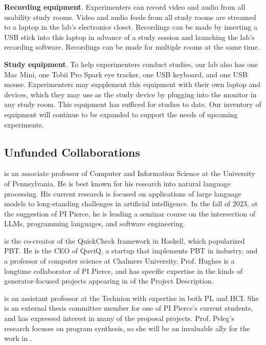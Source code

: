 \textbf{Recording equipment}. Experimenters can record video and audio from all usability study rooms. Video and audio feeds from all study rooms are streamed to a laptop in the lab's electronics closet. Recordings can be made by inserting a USB stick into this laptop in advance of a study session and launching the lab's recording software. Recordings can be made for multiple rooms at the same time.

\textbf{Study equipment}. To help experimenters conduct studies, our lab also has one Mac Mini, one Tobii Pro Spark eye tracker, one USB keyboard, and one USB mouse. Experimenters may supplement this equipment with their own laptop and devices, which they may use as the study device by plugging into the monitor in any study room. This equipment has sufficed for studies to date. Our inventory of equipment will continue to be expanded to support the needs of upcoming experiments.

\subsection*{Unfunded Collaborations}

 is an associate professor of
Computer and Information Science at the University of Pennsylvania.
%
He is best known for his research into natural language
processing. His current research is focused on applications of large
language models to long-standing challenges in artificial
intelligence. In the fall of 2023, at the suggestion of PI Pierce, he
is leading a seminar course on the intersection of LLMs, programming
languages, and software engineering.

 is the co-creator of the QuickCheck framework in
Haskell, which popularized PBT. He is the CEO of QuviQ, a startup that
implements PBT in industry, and a professor of computer science at Chalmers
University.  Prof. Hughes is a longtime collaborator of PI
Pierce, and has specific expertise in the kinds of generator-focused projects
appearing in  of the Project Description.

\smallskip{} is an assistant professor at the Technion with expertise in both
PL and HCI. She is an external thesis committee member for one of PI Pierce's current
students, and has expressed interest in many of the proposal
projects. Prof. Peleg's research
focuses on program synthesis, so she will be an invaluable ally for the work in
.

